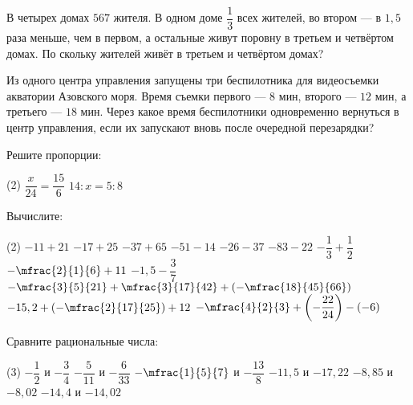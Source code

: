 \begin{class}[number=2]
\begin{listofex}[resume]
		\item В четырех домах \(567\) жителя. В одном доме \(\dfrac{1}{3}\) всех жителей, во втором --- в \(1,5\) раза меньше, чем в первом, а остальные живут поровну в третьем и четвёртом домах. По скольку жителей живёт в третьем и четвёртом домах?
		\item Из одного центра управления запущены три беспилотника для видеосъемки акватории Азовского моря. Время съемки первого --- \(8\) мин, второго --- \(12\) мин, а третьего --- \(18\) мин. Через какое время беспилотники одновременно вернуться в центр управления, если их запускают вновь после очередной перезарядки?
		\item Решите пропорции:
		\begin{tasks}(2)
			\task \( \dfrac{x}{24}=\dfrac{15}{6} \)
			\task \( 14:x=5:8\)
		\end{tasks}
	\end{listofex}
\end{class}

\begin{homework}[number=1]
	\begin{listofex}
		\item Вычислите:
		\begin{tasks}(2)
			\task \( -11 + 21 \)
			\task \( -17+25 \)
			\task \( -37+65 \)
			\task \( -51-14 \)
			\task \( -26-37 \)
			\task \( -83-22 \)
			\task \( -\dfrac{1}{3}+\dfrac{1}{2} \)
			\task \( -\mfrac{2}{1}{6}+11 \)
			\task \( -1,5-\dfrac{3}{7} \)
			\task \( -\mfrac{3}{5}{21}+\mfrac{3}{17}{42}+\left(-\mfrac{18}{45}{66}\right) \)
			\task \( -15,2 + \left(-\mfrac{2}{17}{25}\right) + 12 \)
			\task \( -\mfrac{4}{2}{3} + \left(-\dfrac{22}{24}\right) - (-6) \)
		\end{tasks}
		\item Сравните рациональные числа:
		\begin{tasks}(3)
			\task \( -\dfrac{1}{2} \) и \( -\dfrac{3}{4} \)
			\task \( -\dfrac{5}{11} \) и \( -\dfrac{6}{33} \)
			\task \( -\mfrac{1}{5}{7} \) и \( -\dfrac{13}{8} \)
			\task \( -11,5 \) и \( -17,22 \)
			\task \( -8,85 \) и \( -8,02 \)
			\task \( -14,4 \) и \( -14,02 \)
		\end{tasks}
	\end{listofex}
\end{homework}

